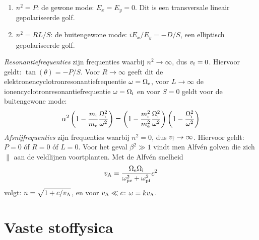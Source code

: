 \documentclass[twoside]{report}
\begin{document}
\begin{enumerate}
\item $n^2=P$: de gewone mode: $E_x=E_y=0$. Dit is een transversale lineair
      gepolariseerde golf.
\item $n^2=RL/S$: de buitengewone mode: $iE_x/E_y=-D/S$, een elliptisch
      gepolariseerde golf.
\end{enumerate}
{\it Resonantiefrequenties} zijn frequenties waarbij $n^2\rightarrow\infty$,
dus $v_{\rm f}=0$. Hiervoor geldt: $\tan(\theta)=-P/S$. Voor $R\rightarrow\infty$
geeft dit de elektronencyclotronresonantiefrequentie $\omega=\Omega_{\rm e}$,
voor $L\rightarrow\infty$ de ionencyclotronresonantiefrequentie $\omega=\Omega_{\rm i}$
en voor $S=0$ geldt voor de buitengewone mode:
\[
\alpha^2\left(1-\frac{m_{\rm i}}{m_{\rm e}}\frac{\Omega_{\rm i}^2}{\omega^2}\right)=
\left(1-\frac{m_{\rm i}^2}{m_{\rm e}^2}\frac{\Omega_{\rm i}^2}{\omega^2}\right)
\left(1-\frac{\Omega_{\rm i}^2}{\omega^2}\right)
\]
{\it Afsnijfrequenties} zijn frequenties waarbij $n^2=0$, dus
$v_{\rm f}\rightarrow\infty$. Hiervoor geldt: $P=0$ \'of $R=0$ \'of $L=0$.
\npar
Voor het geval $\beta^2\gg1$ vindt men Alfv\'en golven die zich $\parallel$
aan de veldlijnen voortplanten. Met de Alfv\'en snelheid
\[
v_{\rm A}=\frac{\Omega_{\rm e}\Omega_{\rm i}}{\omega_{\rm pe}^2+\omega_{\rm pi}^2}c^2
\]
volgt: $n=\sqrt{1+c/v_{\rm A}}$, en voor $v_{\rm A}\ll c$: $\omega=kv_{\rm A}$.

\chapter{Vaste stoffysica}
\def\x{\hbar\omega/kT}
\def\ho{\hbar\omega}
\end{document}
